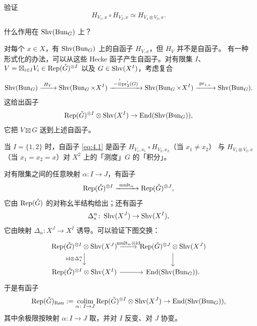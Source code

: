 \begin{exercise}\label{ex:hecke-compose}
验证
\[
H_{V_1,x}\circ H_{V_2,x}\simeq H_{V_1\otimes V_2,x}.
\]
\end{exercise}

\begin{question}\label{ques:action}
什么作用在 \(\operatorname{Shv}(\operatorname{Bun}_G)\) 上？
\end{question}

对每个 \(x\in X\)，有 \(\operatorname{Shv}(\operatorname{Bun}_G)\) 上的自函子 \(H_{V,x}\)，但 \(H_V\) 并不是自函子。
有一种形式化的办法，可以从这些 Hecke 函子产生自函子。对有限集 \(I\)、
\(V=\boxtimes_{i\in I}V_i\in\operatorname{Rep}(\check{G})^{\otimes I}\) 以及 \(G\in\operatorname{Shv}(X^I)\)，考虑复合
\begin{equation}\label{eq:4.1}
\Shv(\Bun_G)\xrightarrow{\ H_V\ }\Shv(\Bun_G\times X^I)
\xrightarrow{\ -\overset{!}{\otimes}\mathrm{pr}_2^!(G)\ }\Shv(\Bun_G\times X^I)
\xrightarrow{\ \mathrm{pr}_{1,*}\ }\Shv(\Bun_G).
\end{equation}
这给出函子
\[
\operatorname{Rep}(\check{G})^{\otimes I}\otimes\operatorname{Shv}(X^I)\to\operatorname{End}(\operatorname{Shv}(\operatorname{Bun}_G)),
\]
它把 \(V\boxtimes G\) 送到上述自函子。

\begin{remark}\label{rem:integration}
当 \(I=\{1,2\}\) 时，自函子 \eqref{eq:4.1} 是函子 \(H_{V_1,x_1}\circ H_{V_2,x_2}\)（当 \(x_1\neq x_2\)）
与 \(H_{V_1\otimes V_2,x}\)（当 \(x_1=x_2=x\)）对 \(X^2\) 上的「测度」\(G\) 的「积分」。
\end{remark}

对有限集之间的任意映射 \(\alpha\colon I\to J\)，有函子
\[
\Rep(\Gd)^{\otimes I}\xrightarrow{\ \mathrm{mult}_\alpha\ }\Rep(\Gd)^{\otimes J},
\]
它由 \(\operatorname{Rep}(\check{G})\) 的对称幺半结构给出；还有函子
\[
\Delta^\alpha_*\colon\operatorname{Shv}(X^J)\to\operatorname{Shv}(X^I),
\]
它由映射 \(\Delta_\alpha\colon X^J\to X^I\) 诱导。可以验证下图交换：
\[
\begin{tikzcd}
\Rep(\Gd)^{\otimes I}\otimes\Shv(X^J) \arrow[r,"\mathrm{mult}_\alpha\otimes\mathrm{id}"] \arrow[d,"\mathrm{id}\otimes\Delta^\alpha_*"'] & \Rep(\Gd)^{\otimes J}\otimes\Shv(X^J) \arrow[d] \\
\Rep(\Gd)^{\otimes I}\otimes\Shv(X^I) \arrow[r] & \End(\Shv(\Bun_G)).
\end{tikzcd}
\]
于是有函子
\begin{equation}\label{eq:4.2}
\operatorname{Rep}(\check{G})_{\mathrm{Ran}}:=\operatorname*{colim}_{\alpha\colon I\to J}
\operatorname{Rep}(\check{G})^{\otimes I}\otimes\operatorname{Shv}(X^J)\to\operatorname{End}(\operatorname{Shv}(\operatorname{Bun}_G)),
\end{equation}
其中余极限按映射 \(\alpha\colon I\to J\) 取，并对 \(I\) 反变、对 \(J\) 协变。

